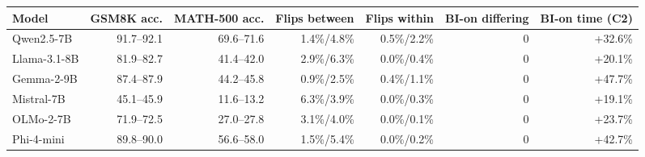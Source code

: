 \begin{tabular}{lrrrrrr}
\toprule
Model & GSM8K acc. & MATH-500 acc. & Flips between & Flips within & BI-on differing & BI-on time (C2) \\
\midrule
Qwen2.5-7B & 91.7--92.1 & 69.6--71.6 & 1.4\%/4.8\% & 0.5\%/2.2\% & 0 & +32.6\% \\
Llama-3.1-8B & 81.9--82.7 & 41.4--42.0 & 2.9\%/6.3\% & 0.0\%/0.4\% & 0 & +20.1\% \\
Gemma-2-9B & 87.4--87.9 & 44.2--45.8 & 0.9\%/2.5\% & 0.4\%/1.1\% & 0 & +47.7\% \\
Mistral-7B & 45.1--45.9 & 11.6--13.2 & 6.3\%/3.9\% & 0.0\%/0.3\% & 0 & +19.1\% \\
OLMo-2-7B & 71.9--72.5 & 27.0--27.8 & 3.1\%/4.0\% & 0.0\%/0.1\% & 0 & +23.7\% \\
Phi-4-mini & 89.8--90.0 & 56.6--58.0 & 1.5\%/5.4\% & 0.0\%/0.2\% & 0 & +42.7\% \\
\bottomrule
\end{tabular}
